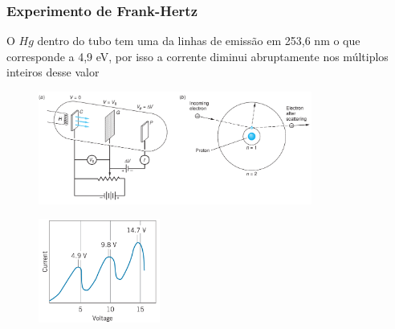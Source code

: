 \documentclass[12pt,brazil]{beamer}
\begin{document}
\begin{frame}
  \frametitle{Experimento de Frank-Hertz}

  \begin{multicols}{2}
    \begin{minipage}[b][20ex][t]{\linewidth}
    \vspace*{1.5cm}
        \fontsize{9pt}{11pt}\selectfont
      
        O $Hg$ dentro do tubo tem uma da linhas de emissão em 253,6 nm o que corresponde a 4,9 eV, por isso a corrente diminui abruptamente nos múltiplos inteiros desse valor
      
    \end{minipage}

    \begin{minipage}[b][20ex][t]{\linewidth}
    \vspace*{-0.5cm}
      \begin{figure}
        \hspace*{1.5cm}\includegraphics[width=9cm]{figuras/fig09}
      \end{figure}
    \end{minipage}

    \begin{minipage}[b][40ex][t]{\linewidth}
    \vspace*{0.50cm}
      \begin{figure}
        \includegraphics[width=4cm]{figuras/fig10}
      \end{figure}
    \end{minipage}
  \end{multicols}
\end{frame}
\end{document}
